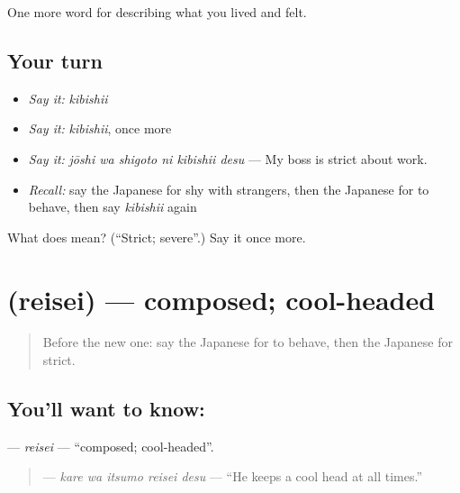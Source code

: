 \begin{grammarlens}[title={What you've built}]
One more word for describing what you lived and felt.
\end{grammarlens}

\subsection*{Your turn}
\begin{itemize}
\raggedright
  \item \emph{Say it:} \emph{kibishii}
  \item \emph{Say it:} \emph{kibishii}, once more
  \item \emph{Say it:} \emph{jōshi wa shigoto ni kibishii desu} — My boss is strict about work.
  \item \emph{Recall:} say the Japanese for shy with strangers, then the Japanese for to behave, then say \emph{kibishii} again
\end{itemize}

\begin{tcolorbox}[breakable,colback=teal!4,colframe=teal!35!black,title={Before you move on}]
What does  mean? (\textquotedblleft{}Strict; severe\textquotedblright{}.) Say it once more.
\end{tcolorbox}
\section[\texorpdfstring{\ja{れいせい} (reisei)}{れいせい (reisei)}]{ (reisei) — composed; cool-headed}

\label{lesson:JA-C437-reisei}



\begin{quote}
Before the new one: say the Japanese for to behave, then the Japanese for strict.
\end{quote}

\subsection*{You'll want to know: }
\textbf{} — \emph{reisei} — \textquotedblleft{}composed; cool-headed\textquotedblright{}.

\begin{quote}
\textbf{  } — \emph{kare wa itsumo reisei desu} — \textquotedblleft{}He keeps a cool head at all times.\textquotedblright{}
\end{quote}

